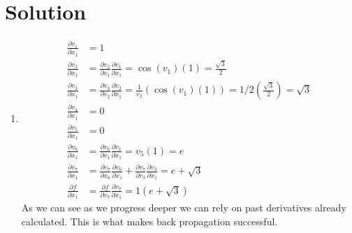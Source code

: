 \documentclass[submit]{harvardml}
\newenvironment{answer}
  {\section*{Solution}}
{}
\begin{document}
\begin{answer}
\begin{enumerate}
\begin{enumerate}
            \item
                  \begin{align*}
                    \frac{\partial v_1}{\partial x_1} & = 1  \\
                    \frac{\partial v_2}{\partial x_1} & =  \frac{\partial v_2}{\partial v_1}\frac{\partial v_1}{\partial x_1} = \cos(v_1)(1) = \frac{\sqrt{3}}{2}\\
                    \frac{\partial v_3}{\partial x_1} & = \frac{\partial v_3}{\partial v_2}\frac{\partial v_2}{\partial x_1} = \frac{1}{v_2}(\cos(v_1)(1)) = 1/2(\frac{\sqrt{3}}{2}) = \sqrt{3}\\
                    \frac{\partial v_4}{\partial x_1} & = 0\\
                    \frac{\partial v_5}{\partial x_1} & = 0\\
                    \frac{\partial v_6}{\partial x_1} & = \frac{\partial v_6}{\partial v_1}\frac{\partial v_1}{\partial x_1} = v_5(1) = e\\
                    \frac{\partial v_7}{\partial x_1} & = \frac{\partial v_7}{\partial x_6}\frac{\partial v_6}{\partial x_1} + \frac{\partial v_7}{\partial v_3}\frac{\partial v_3}{\partial x_1} = e + \sqrt{3}\\
                    \frac{\partial f}{\partial x_1}   & = \frac{\partial f}{\partial v_7} \frac{\partial v_7}{\partial x_1} = 1(e + \sqrt{3})
                  \end{align*}
                  As we can see as we progress deeper we can rely on past derivatives already calculated. This is what makes back propagation successful. 
          \end{enumerate}

  \end{enumerate}
\end{answer}


\newpage

\end{document}
